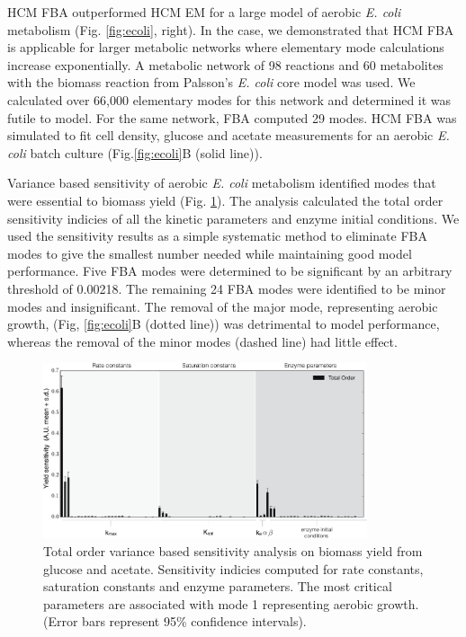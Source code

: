 \documentclass[10pt,twocolumn,twoside,final]{IEEEtran}
\begin{document}
HCM FBA outperformed HCM EM for a large model of aerobic \textit{E. coli} metabolism (Fig. \ref{fig:ecoli}, right).
In the  case, we demonstrated that HCM FBA is applicable for larger metabolic networks where elementary mode calculations increase exponentially.
A metabolic network\cite{2007_schuetz_etal_MolSysBio} of 98 reactions and 60 metabolites with the biomass reaction from Palsson's \textit{E. coli} core model\cite{2006_Palsson_model} was used.
We calculated over 66,000 elementary modes for this network and determined it was futile to model.
For the same network, FBA computed 29 modes.
HCM FBA was simulated to fit cell density, glucose and acetate measurements for an aerobic \textit{E. coli} batch culture\cite{1994_varma_palsson_ApplEnvMicro} (Fig.\ref{fig:ecoli}B (solid line)).

Variance based sensitivity of aerobic \textit{E. coli} metabolism identified modes that were essential to biomass yield (Fig. \ref{fig:sensitivity}).
The analysis calculated the total order sensitivity indicies of all the kinetic parameters and enzyme initial conditions.
We used the sensitivity results as a simple systematic method to eliminate FBA modes to give the smallest number needed while maintaining good model performance.
Five FBA modes were determined to be significant by an arbitrary threshold of 0.00218.
The remaining 24 FBA modes were identified to be minor modes and insignificant.
The removal of the major mode, representing aerobic growth, (Fig, \ref{fig:ecoli}B (dotted line)) was detrimental to model performance, whereas the removal of the minor modes (dashed line) had little effect.

\begin{figure}[!t]\centering
\includegraphics[width=0.85\textwidth]{./figs/Fig-3-Sensitivity-Results.pdf}
\caption{Total order variance based sensitivity analysis on biomass yield from glucose and acetate. Sensitivity indicies computed for rate constants, saturation constants and enzyme parameters. The most critical parameters are associated with mode 1 representing aerobic growth. (Error bars represent 95\% confidence intervals).
}
\label{fig:sensitivity}
\end{figure}
\end{document}
